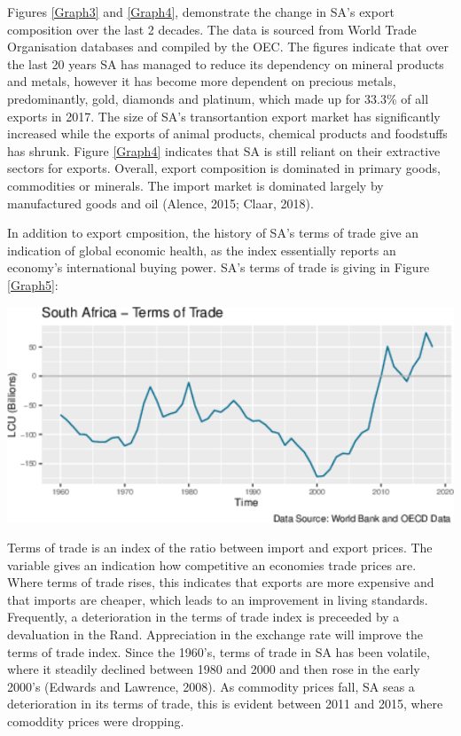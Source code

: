 \documentclass[11pt,preprint, authoryear]{elsarticle}
\let\origfigure\figure
\let\endorigfigure\endfigure
\renewenvironment{figure}[1][2] {
    \expandafter\origfigure\expandafter[H]
} {
    \endorigfigure
}
\numberwithin{equation}{section}
\numberwithin{figure}{section}
\numberwithin{table}{section}
\begin{document}
Figures \ref{Graph3} and \ref{Graph4}, demonstrate the change in SA's
export composition over the last 2 decades. The data is sourced from
World Trade Organisation databases and compiled by the OEC. The figures
indicate that over the last 20 years SA has managed to reduce its
dependency on mineral products and metals, however it has become more
dependent on precious metals, predominantly, gold, diamonds and
platinum, which made up for 33.3\% of all exports in 2017. The size of
SA's transortantion export market has significantly increased while the
exports of animal products, chemical products and foodstuffs has shrunk.
Figure \ref{Graph4} indicates that SA is still reliant on their
extractive sectors for exports. Overall, export composition is dominated
in primary goods, commodities or minerals. The import market is
dominated largely by manufactured goods and oil (Alence, 2015; Claar,
2018).

In addition to export cmposition, the history of SA's terms of trade
give an indication of global economic health, as the index essentially
reports an economy's international buying power. SA's terms of trade is
giving in Figure \ref{Graph5}:

\begin{figure}[H]

{\centering \includegraphics{tradedynamics1_files/figure-latex/Graph5-1} 

}

\caption{South Africa's Terms of Trade between 1960 and 2018 \label{Graph5}}\label{fig:Graph5}
\end{figure}

Terms of trade is an index of the ratio between import and export
prices. The variable gives an indication how competitive an economies
trade prices are. Where terms of trade rises, this indicates that
exports are more expensive and that imports are cheaper, which leads to
an improvement in living standards. Frequently, a deterioration in the
terms of trade index is preceeded by a devaluation in the Rand.
Appreciation in the exchange rate will improve the terms of trade index.
Since the 1960's, terms of trade in SA has been volatile, where it
steadily declined between 1980 and 2000 and then rose in the early
2000's (Edwards and Lawrence, 2008). As commodity prices fall, SA seas a
deterioration in its terms of trade, this is evident between 2011 and
2015, where comoddity prices were dropping.
\end{document}
